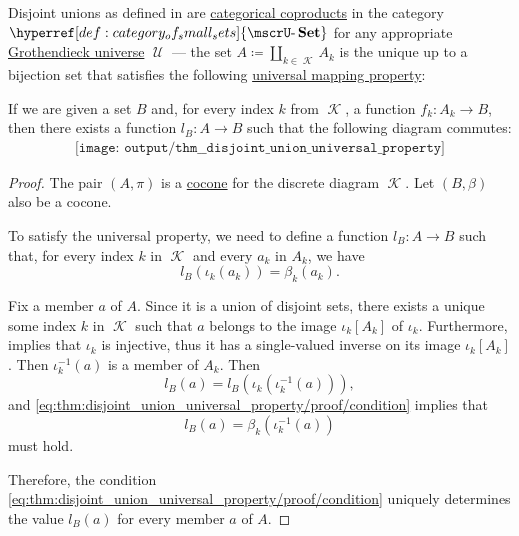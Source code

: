 \begin{theorem}\label{thm:disjoint_union_universal_property}
  Disjoint unions as defined in  are \hyperref[def:discrete_category_limits]{categorical coproducts} in the category \( \hyperref[def:category_of_small_sets]{\ucat{Set}} \) for any appropriate \hyperref[def:grothendieck_universe]{Grothendieck universe} \( \mscrU \) --- the set \( A \coloneqq \coprod_{k \in \mscrK} A_k \) is the unique up to a bijection set that satisfies the following \hyperref[rem:universal_mapping_property]{universal mapping property}:
  \begin{displayquote}
    If we are given a set \( B \) and, for every index \( k \) from \( \mscrK \), a function \( f_k: A_k \to B \), then there exists a function \( l_B: A \to B \) such that the following diagram commutes:
    \begin{equation}\label{eq:thm:disjoint_union_universal_property/diagram}
      \begin{aligned}
        \texttt{[image: output/thm\_\_disjoint\_union\_universal\_property]}
      \end{aligned}
    \end{equation}
  \end{displayquote}
\end{theorem}
\begin{proof}
  The pair \( (A, \pi) \) is a \hyperref[def:category_of_cones/cocone]{cocone} for the discrete diagram \( \mscrK \). Let \( (B, \beta) \) also be a cocone.

  To satisfy the universal property, we need to define a function \( l_B: A \to B \) such that, for every index \( k \) in \( \mscrK \) and every \( a_k \) in \( A_k \), we have
  \begin{equation}\label{eq:thm:disjoint_union_universal_property/proof/condition}
    l_B(\iota_k(a_k)) = \beta_k(a_k).
  \end{equation}

  Fix a member \( a \) of \( A \). Since it is a union of disjoint sets, there exists a unique some index \( k \) in \( \mscrK \) such that \( a \) belongs to the image \( \iota_k[A_k] \) of \( \iota_k \). Furthermore,  implies that \( \iota_k \) is injective, thus it has a single-valued inverse on its image \( \iota_k[A_k] \). Then \( \iota_k^{-1}(a) \) is a member of \( A_k \). Then
  \begin{equation*}
    l_B(a) = l_B(\iota_k(\iota_k^{-1}(a))),
  \end{equation*}
  and \eqref{eq:thm:disjoint_union_universal_property/proof/condition} implies that
  \begin{equation*}
    l_B(a) = \beta_k(\iota_k^{-1}(a))
  \end{equation*}
  must hold.

  Therefore, the condition \eqref{eq:thm:disjoint_union_universal_property/proof/condition} uniquely determines the value \( l_B(a) \) for every member \( a \) of \( A \).
\end{proof}

